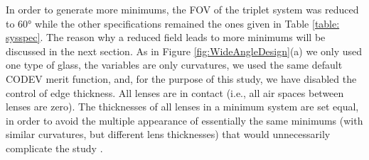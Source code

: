 In order to generate more minimums, the FOV of the triplet system was reduced to 60° while the other specifications remained the ones given in Table \ref{table: sysspec}. The reason why a reduced
field leads to more minimums will be discussed in the next section.
As in Figure \ref{fig:WideAngleDesign}(a) we only used one type of glass, the variables are only curvatures, we used the same default CODEV merit function, and, for the purpose of this study, we have disabled the control of edge thickness. All lenses are in contact (i.e., all air spaces between lenses are zero). The thicknesses of all lenses in a minimum system are set equal, in order to avoid the multiple appearance of essentially the same minimums (with similar curvatures, but different lens thicknesses) that would unnecessarily complicate the study \cite{HouProc2015}.

